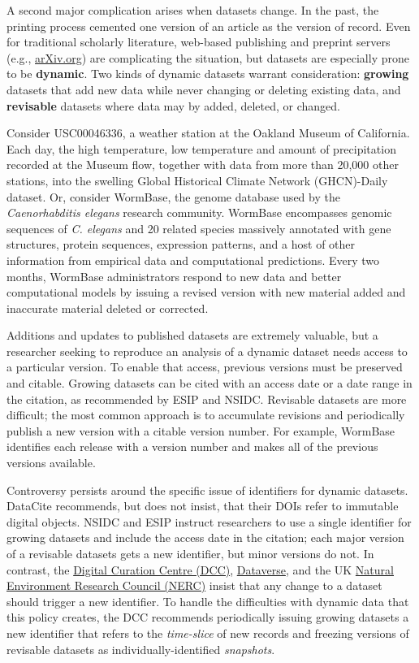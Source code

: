 \documentclass[10pt,a4paper,twocolumn]{article}
\begin{document}
{{A second major complication arises when datasets change.
In the past, the printing process cemented one version of an article as the version of record.
Even for traditional scholarly literature, web-based publishing and preprint servers (e.g., \href{http://arxiv.org/}{arXiv.org}) are complicating the situation, but datasets are especially prone to be \textbf{dynamic}.
Two kinds of dynamic datasets warrant consideration: \textbf{growing} datasets that add new data while never changing or deleting existing data, and \textbf{revisable} datasets where data may by added, deleted, or changed.

Consider USC00046336, a weather station at the Oakland Museum of California.
Each day, the high temperature, low temperature and amount of precipitation recorded at the Museum \cite{global_historical_climate_data_network_daily_????} flow, together with data from more than 20,000 other stations, into the swelling Global Historical Climate Network (GHCN)-Daily\cite{menne_overview_2012} dataset.
Or, consider WormBase, the genome database used by the \textit{Caenorhabditis elegans} research community.
WormBase encompasses genomic sequences of \emph{C. elegans} and 20 related species massively annotated with gene structures, protein sequences, expression patterns, and a host of other information from empirical data and computational predictions.
Every two months, WormBase administrators respond to new data and better computational models by issuing a revised version with new material added and inaccurate material deleted or corrected.

Additions and updates to published datasets are extremely valuable, but a researcher seeking to reproduce an analysis of a dynamic dataset needs access to a particular version.
To enable that access, previous versions must be preserved and citable.
Growing datasets can be cited with an access date or a date range in the citation, as recommended by ESIP and NSIDC.
Revisable datasets are more difficult; the most common approach is to accumulate revisions and periodically publish a new version with a citable version number.
For example, WormBase identifies each release with a version number and makes all of the previous versions available.

Controversy persists around the specific issue of identifiers for dynamic datasets. 
DataCite recommends, but does not insist, that their DOIs refer to immutable digital objects.
NSIDC and ESIP instruct researchers to use a single identifier for growing datasets and include the access date in the citation; each major version of a revisable datasets gets a new identifier, but minor versions do not.
In contrast, the \href{http://www.dcc.ac.uk/}{Digital Curation Centre (DCC)}, \href{http://thedata.org/}{Dataverse}, and the UK \href{http://www.nerc.ac.uk/}{Natural Environment Research Council (NERC)} insist that any change to a dataset should trigger a new identifier\cite{ball_how_2012,altman_proposed_2007,callaghan_making_2012}.
To handle the difficulties with dynamic data that this policy creates, the DCC recommends periodically issuing growing datasets a new identifier that refers to the \emph{time-slice} of new records and freezing versions of revisable datasets as individually-identified \emph{snapshots}.

}}
\end{document}
